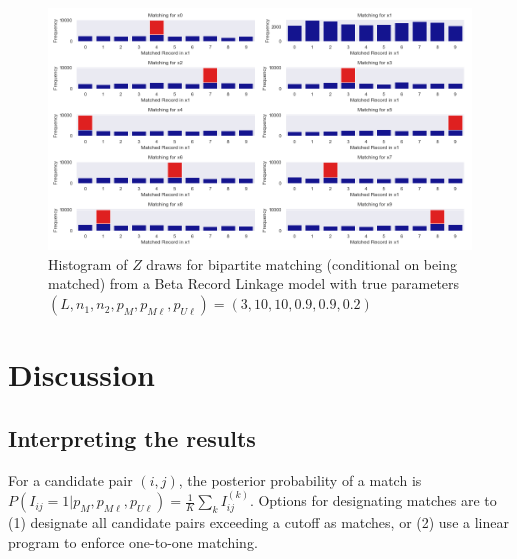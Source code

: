 \documentclass[11pt,reqno]{amsart}
\begin{document}
\begin{figure}[h!]
\begin{center}
\includegraphics[width=\textwidth]{../Figures/bpm/nM9/ZmatchesnM9_L3_cond.png}
\caption{Histogram of $Z$ draws for bipartite matching (conditional on being matched) from a Beta Record Linkage model with true parameters $(L, n_1, n_2, p_M, p_{M\ell}, p_{U\ell}) = (3, 10, 10, 0.9, 0.9, 0.2)$ }
\label{ZtraceCond}
\end{center}
\end{figure}


\section{Discussion}

\subsection{Interpreting the results}  For a candidate pair $(i,j)$, the posterior probability of a match is $P(I_{ij}  = 1 | p_M, p_{M\ell}, p_{U\ell}) = \frac{1}{K}\sum_k I_{ij}^{(k)}$.  Options for designating matches are to (1) designate all candidate pairs exceeding a cutoff as matches, or (2) use a linear program to enforce one-to-one matching. 
\end{document}
